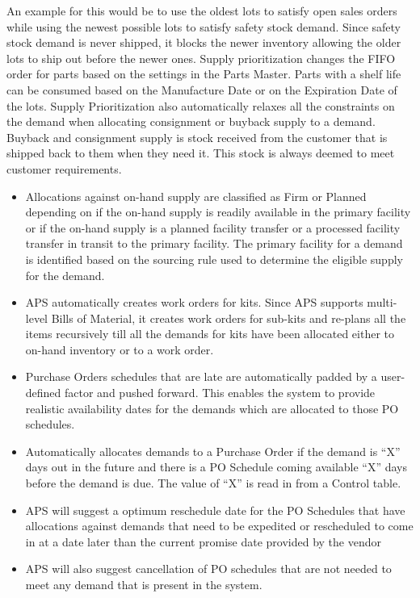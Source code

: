 \documentclass[letterpaper,10pt,english]{sphinxmanual}
\begin{document}
An example for this would be to use the oldest lots
to satisfy open sales orders while using the newest possible lots to
satisfy safety stock demand. Since safety stock demand is never shipped,
it blocks the newer inventory allowing the older lots to ship out before
the newer ones. Supply prioritization changes the FIFO order for parts
based on the settings in the Parts Master. Parts with a shelf life can
be consumed based on the Manufacture Date or on the Expiration Date of
the lots. Supply Prioritization also automatically relaxes all the
constraints on the demand when allocating consignment or buyback supply
to a demand. Buyback and consignment supply is stock received from the
customer that is shipped back to them when they need it. This stock is
always deemed to meet customer requirements.
\begin{itemize}
\item {} 
Allocations against on-hand supply are classified as Firm or Planned
depending on if the on-hand supply is readily available in the
primary facility or if the on-hand supply is a planned facility
transfer or a processed facility transfer in transit to the primary
facility. The primary facility for a demand is identified based on
the sourcing rule used to determine the eligible supply for the
demand.

\item {} 
APS automatically creates work orders for kits. Since APS supports
multi-level Bills of Material, it creates work orders for sub-kits
and re-plans all the items recursively till all the demands for kits
have been allocated either to on-hand inventory or to a work order.

\item {} 
Purchase Orders schedules that are late are automatically padded by
a user-defined factor and pushed forward. This enables the system to
provide realistic availability dates for the demands which are
allocated to those PO schedules.

\item {} 
Automatically allocates demands to a Purchase Order if the demand is
“X” days out in the future and there is a PO Schedule coming
available “X” days before the demand is due. The value of “X” is
read in from a Control table.

\item {} 
APS will suggest a optimum reschedule date for the PO Schedules that
have allocations against demands that need to be expedited or
rescheduled to come in at a date later than the current promise date
provided by the vendor

\item {} 
APS will also suggest cancellation of PO schedules that are not
needed to meet any demand that is present in the system.

\end{itemize}
\end{document}
